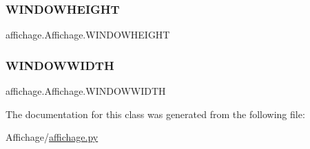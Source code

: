 \subsubsection{\texorpdfstring{W\+I\+N\+D\+O\+W\+H\+E\+I\+G\+HT}{WINDOWHEIGHT}}
{\footnotesize\ttfamily affichage.\+Affichage.\+W\+I\+N\+D\+O\+W\+H\+E\+I\+G\+HT}

\mbox{\label{classaffichage_1_1_affichage_aab192d8bb91c1687fb02898a80beecf1}} 
\subsubsection{\texorpdfstring{W\+I\+N\+D\+O\+W\+W\+I\+D\+TH}{WINDOWWIDTH}}
{\footnotesize\ttfamily affichage.\+Affichage.\+W\+I\+N\+D\+O\+W\+W\+I\+D\+TH}



The documentation for this class was generated from the following file\+:\begin{DoxyCompactItemize}
\item 
Affichage/\hyperlink{affichage_8py}{affichage.\+py}\end{DoxyCompactItemize}
